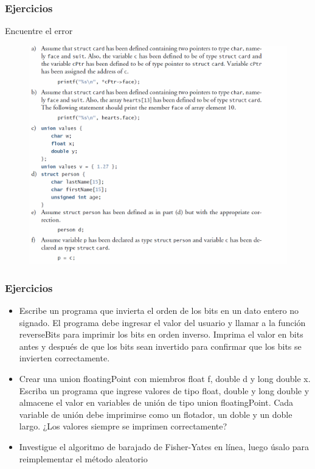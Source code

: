 \documentclass[10.5pt,scale=1.0,t,aspectratio=169,hyperref={pdfpagelabels=false}]{beamer}
\begin{document}
\begin{frame}
	\frametitle{Ejercicios}
	Encuentre el error
	\begin{figure}
		\centering
		\includegraphics[scale=0.45]{ErrorUnion}
	\end{figure}
\end{frame}
\begin{frame}
	\frametitle{Ejercicios}
	\begin{itemize}
		\item Escribe un programa que invierta el orden de los bits en un dato entero no signado. El programa debe ingresar el valor del usuario y llamar a la función reverseBits	para imprimir los bits en orden inverso. Imprima el valor en bits antes y después de que los bits sean invertido para confirmar que los bits se invierten correctamente.
		\item Crear una union floatingPoint con miembros float f, double d y long
		double x. Escriba un programa que ingrese valores de tipo float, double y long double y almacene el valor en variables de unión de tipo union floatingPoint. Cada variable de unión debe imprimirse como un flotador, un doble y un doble largo. ¿Los valores siempre se imprimen correctamente?
		\item Investigue el algoritmo de barajado de Fisher-Yates en línea,
		luego úsalo para reimplementar el método aleatorio		
	\end{itemize}
\end{frame}
\frame{
\begin{center}
	\LARGE \textcolor{blue}{UNIONES, ESTRUCTURAS Y MANIPULACION DE BITS EN C}
\end{center}

\begin{center}
	\LARGE \textcolor{blue}{GRACIAS}
\end{center}
}

\end{document}
